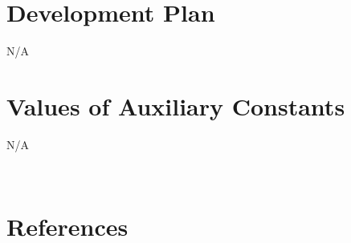 \documentclass[12pt]{article}
\begin{document}
  
  
  


\section{Development Plan}
N/A

\section{Values of Auxiliary Constants}
N/A


~\newpage

\section{References}
\end{document}
